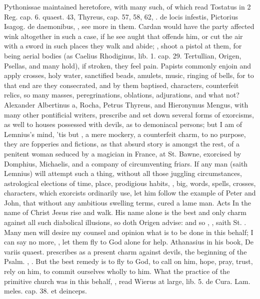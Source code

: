 {Pythonissae maintained heretofore, with many such, of which read
Tostatus in \textlatin{2 Reg. cap. 6. quaest. 43}, Thyreus, \textlatin{cap. 57, 58, 62}, \etc{}. \textlatin{de
locis infestis}, Pictorius Isagog. \textlatin{de daemonibus}, \etc{}, see more in them.
Cardan would have the party affected wink altogether in such a case, if
he see aught that offends him, or cut the air with a sword in such
places they walk and abide; , shoot a
pistol at them, for being aerial bodies (as Caelius Rhodiginus, \textlatin{lib. 1.
cap. 29.} Tertullian, Origen, Psellas, and many hold), if stroken, they
feel pain. Papists commonly enjoin and apply crosses, holy water,
sanctified beads, amulets, music, ringing of bells, for to that end are
they consecrated, and by them baptised, characters, counterfeit relics,
so many masses, peregrinations, oblations, adjurations, and what not?
Alexander Albertinus a, Rocha, Petrus Thyreus, and Hieronymus Mengus,
with many other pontificial writers, prescribe and set down several
forms of exorcisms, as well to houses possessed with devils, as to
demoniacal persons; but I am of Lemnius's mind, 'tis but , a mere mockery, a counterfeit charm,
to no purpose, they are fopperies and fictions, as that absurd
story is amongst the rest, of a penitent woman seduced by a
magician in France, at St. Bawne, exorcised by Domphius, Michaelis, and
a company of circumventing friars. If any man (saith Lemnius) will
attempt such a thing, without all those juggling circumstances,
astrological elections of time, place, prodigious habits, , big,
 words, spells, crosses, characters, which exorcists
ordinarily use, let him follow the example of Peter and John, that
without any ambitious swelling terms, cured a lame man. Acts  In
the name of Christ Jesus rise and walk. His name alone is the best and
only charm against all such diabolical illusions, so doth Origen
advise: and so \Chrysostom{}, , saith St. \Austin{}. Many men will desire my counsel
and opinion what is to be done in this behalf; I can say no more, , let
them fly to God alone for help. Athanasius in his book, \textlatin{De variis
quaest.} prescribes as a present charm against devils, the beginning of
the  Psalm. , \etc{}. But the best
remedy is to fly to God, to call on him, hope, pray, trust, rely on
him, to commit ourselves wholly to him. What the practice of the
primitive church was in this behalf, ,
read Wierus at large, \textlatin{lib. 5. de Cura. Lam. meles. cap. 38. et
deinceps}.

}
